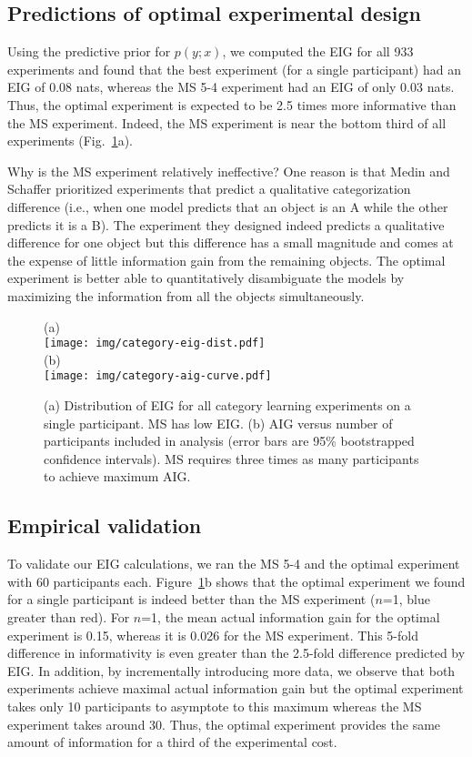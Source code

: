 \documentclass[10pt,letterpaper]{article}
\begin{document}
\subsection{Predictions of optimal experimental design}

Using the predictive prior for $p(y; x)$, we computed the EIG for all 933 experiments and found that the best experiment (for a single participant) had an EIG of 0.08 nats, whereas the MS 5-4 experiment had an EIG of only 0.03 nats.
Thus, the optimal experiment is expected to be 2.5 times more informative than the MS experiment.
Indeed, the MS experiment is near the bottom third of all experiments (Fig.~\ref{fig:dist}a).

Why is the MS experiment relatively ineffective?
One reason is that Medin and Schaffer prioritized experiments that predict a qualitative categorization difference (i.e., when one model predicts that an object is an A while the other predicts it is a B).
The experiment they designed indeed predicts a qualitative difference for one object but this difference has a small magnitude and comes at the expense of little information gain from the remaining objects.
The optimal experiment is better able to quantitatively disambiguate the models by maximizing the information from all the objects simultaneously.

\begin{figure}[t]
(a) \\
\texttt{[image: img/category-eig-dist.pdf]}\\
(b) \\
\texttt{[image: img/category-aig-curve.pdf]}
\caption{(a) Distribution of EIG for all category learning experiments on a single participant. MS has low EIG. (b) AIG versus number of participants included in analysis (error bars are 95\% bootstrapped confidence intervals). MS requires three times as many participants to achieve maximum AIG.}
\label{fig:dist}
\end{figure}

\subsection{Empirical validation}

To validate our EIG calculations, we ran the MS 5-4 and the optimal experiment with 60 participants each.
Figure~\ref{fig:dist}b shows that the optimal experiment we found for a single participant is indeed better than the MS experiment ($n$=1, blue greater than red).
For $n$=1, the mean actual information gain for the optimal experiment is 0.15, whereas it is 0.026 for the MS experiment.
This 5-fold difference in informativity is even greater than the 2.5-fold difference predicted by EIG.
In addition, by incrementally introducing more data, we observe that both experiments achieve maximal actual information gain but the optimal experiment takes only 10 participants to asymptote to this maximum whereas the MS experiment takes around 30.
Thus, the optimal experiment provides the same amount of information for a third of the experimental cost.
\end{document}

